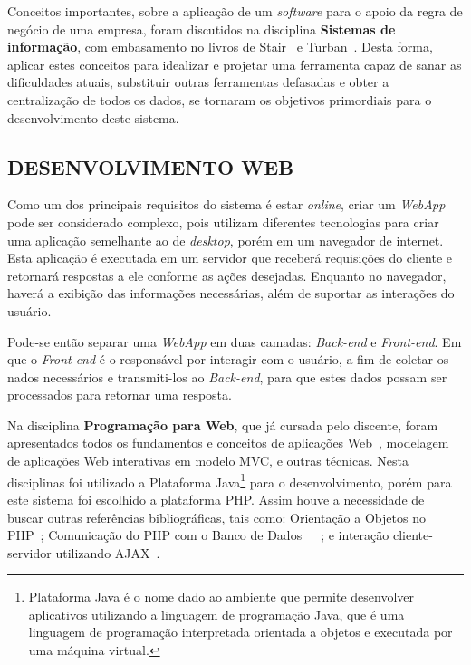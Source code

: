 \documentclass[
  12pt,				%
  openany,
  oneside,
  a4paper,			%
  english,			%
  brazil
]{article}
\numberwithin{figure}{section}
\numberwithin{table}{section}
\begin{document}
Conceitos importantes, sobre a aplicação de um \textit{software} para o apoio da regra de negócio de uma empresa, foram discutidos na disciplina \textbf{Sistemas de informação}, com embasamento no livros de Stair~\cite{SI_principios} e Turban~\cite{SI_turban}. Desta forma, aplicar estes conceitos para idealizar e projetar uma ferramenta capaz de sanar as dificuldades atuais, substituir outras ferramentas defasadas e obter a centralização de todos os dados, se tornaram os objetivos primordiais para o desenvolvimento deste sistema.

\subsection{DESENVOLVIMENTO WEB}
Como um dos principais requisitos do sistema é estar \textit{online}, criar um \textit{WebApp} pode ser considerado complexo, pois utilizam diferentes tecnologias para criar uma aplicação semelhante ao de \textit{desktop}, porém em um navegador de internet. Esta aplicação é executada em um servidor que receberá requisições do cliente e retornará respostas a ele conforme as ações desejadas. Enquanto no navegador, haverá a exibição das informações necessárias, além de suportar as interações do usuário.

Pode-se então separar uma \textit{WebApp} em duas camadas: \textit{Back-end} e \textit{Front-end}. Em que o \textit{Front-end} é o responsável por interagir com o usuário, a fim de coletar os nados necessários e transmiti-los ao \textit{Back-end}, para que estes dados possam ser processados para retornar uma resposta.

Na disciplina \textbf{Programação para Web}, que já cursada pelo discente, foram apresentados todos os fundamentos e conceitos de aplicações Web~\cite{pWeb_sebesta}, modelagem de aplicações Web interativas em modelo MVC, e outras técnicas. Nesta disciplinas foi utilizado a Plataforma Java\footnote{Plataforma Java é o nome dado ao ambiente que permite desenvolver aplicativos utilizando a linguagem de programação Java, que é uma linguagem de programação interpretada orientada a objetos e executada por uma máquina virtual.} para o desenvolvimento, porém para este sistema foi escolhido a plataforma PHP. Assim houve a necessidade de buscar outras referências bibliográficas, tais como: Orientação a Objetos no PHP~\cite{PHP_Novatec_poo}; Comunicação do PHP com o Banco de Dados~\cite{PHP_Novatec_dev}~\cite{PHP_Novatec_appWeb}~\cite{PHP_mysql}; e interação cliente-servidor utilizando AJAX~\cite{PHP_Novatec_ajax}.
\end{document}
